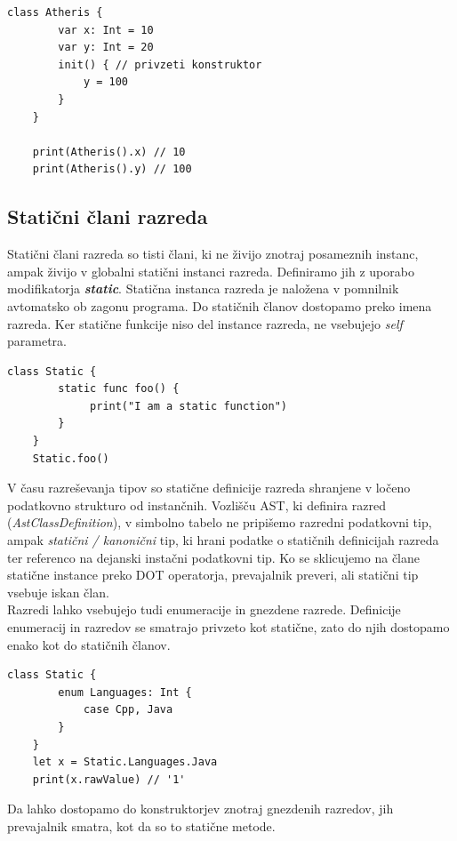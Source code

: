 \documentclass[a4paper, 12pt]{book}
\begin{document}
\begin{lstlisting}[caption={Eksplicitni privzeti konstruktor}, captionpos=b]
	class Atheris {
	    var x: Int = 10
	    var y: Int = 20
	    init() { // privzeti konstruktor
	        y = 100
	    }
	}
	
	print(Atheris().x) // 10
	print(Atheris().y) // 100
\end{lstlisting}

\subsection{Statični člani razreda}

Statični člani razreda so tisti člani, ki ne živijo znotraj posameznih instanc, ampak živijo v globalni statični instanci razreda. Definiramo jih z uporabo modifikatorja \textit{\textbf{static}}. Statična instanca razreda je naložena v pomnilnik avtomatsko ob zagonu programa. Do statičnih članov dostopamo preko imena razreda. Ker statične funkcije niso del instance razreda, ne vsebujejo \textit{self} parametra.

\begin{lstlisting}[caption={Klicanje statične funkcije}, captionpos=b]
	class Static {
   	    static func foo() {
	         print("I am a static function")
	    }
	} 
	Static.foo()
\end{lstlisting}

\indent V času razreševanja tipov so statične definicije razreda shranjene v ločeno podatkovno strukturo od instančnih. Vozlišču AST, ki definira razred (\textit{AstClassDefinition}), v simbolno tabelo ne pripišemo razredni podatkovni tip, ampak \textit{statični / kanonični} tip, ki hrani podatke o statičnih definicijah razreda ter referenco na dejanski instačni podatkovni tip. Ko se sklicujemo na člane statične instance preko DOT operatorja, prevajalnik preveri, ali statični tip vsebuje iskan član.\\
\indent Razredi lahko vsebujejo tudi enumeracije in gnezdene razrede. Definicije enumeracij in razredov se smatrajo privzeto kot statične, zato do njih dostopamo enako kot do statičnih članov. 

\begin{lstlisting}[caption={Enumeracija znotraj razreda}, captionpos=b]
	class Static {
	    enum Languages: Int {
	        case Cpp, Java
	    }
	}
	let x = Static.Languages.Java
	print(x.rawValue) // '1'
\end{lstlisting}

Da lahko dostopamo do konstruktorjev znotraj gnezdenih razredov, jih prevajalnik smatra, kot da so to statične metode.
\end{document}
